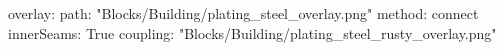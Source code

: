 overlay:
  path: "Blocks/Building/plating_steel_overlay.png"
  method: connect
  innerSeams: True
  coupling: "Blocks/Building/plating_steel_rusty_overlay.png"